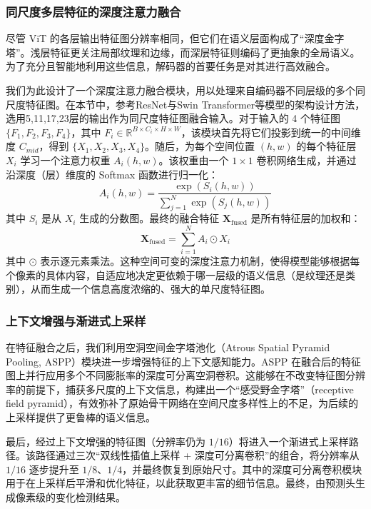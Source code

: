 \subsubsection{同尺度多层特征的深度注意力融合}
尽管 ViT 的各层输出特征图分辨率相同，但它们在语义层面构成了“深度金字塔”。浅层特征更关注局部纹理和边缘，而深层特征则编码了更抽象的全局语义。为了充分且智能地利用这些信息，解码器的首要任务是对其进行高效融合。

我们为此设计了一个深度注意力融合模块，用以处理来自编码器不同层级的多个同尺度特征图。在本节中，参考ResNet与Swin Transformer等模型的架构设计方法，选用5,11,17,23层的输出作为同尺度特征图融合输入。对于输入的 4 个特征图 $\{F_1, F_2, F_3, F_4\}$，其中 $F_i \in \mathbb{R}^{B \times C_i \times H \times W}$，该模块首先将它们投影到统一的中间维度 $C_{mid}$，得到 $\{X_1, X_2, X_3, X_4\}$。随后，为每个空间位置 $(h, w)$ 的每个特征层 $X_i$ 学习一个注意力权重 $A_i(h, w)$。该权重由一个 $1 \times 1$ 卷积网络生成，并通过沿深度（层）维度的 Softmax 函数进行归一化：
\begin{equation}
    A_i(h, w) = \frac{\exp(S_i(h, w))}{\sum_{j=1}^{N} \exp(S_j(h, w))}
\end{equation}
其中 $S_i$ 是从 $X_i$ 生成的分数图。最终的融合特征 $\mathbf{X}_{\text{fused}}$ 是所有特征层的加权和：
\begin{equation}
    \mathbf{X}_{\text{fused}} = \sum_{i=1}^{N} A_i \odot X_i
\end{equation}
其中 $\odot$ 表示逐元素乘法。这种空间可变的深度注意力机制，使得模型能够根据每个像素的具体内容，自适应地决定更依赖于哪一层级的语义信息（是纹理还是类别），从而生成一个信息高度浓缩的、强大的单尺度特征图。

\subsubsection{上下文增强与渐进式上采样}
在特征融合之后，我们利用空洞空间金字塔池化（Atrous Spatial Pyramid Pooling, ASPP）模块进一步增强特征的上下文感知能力。ASPP 在融合后的特征图上并行应用多个不同膨胀率的深度可分离空洞卷积。这能够在不改变特征图分辨率的前提下，捕获多尺度的上下文信息，构建出一个“感受野金字塔”（receptive field pyramid），有效弥补了原始骨干网络在空间尺度多样性上的不足，为后续的上采样提供了更鲁棒的语义信息。

最后，经过上下文增强的特征图（分辨率仍为 $1/16$）将进入一个渐进式上采样路径。该路径通过三次“双线性插值上采样 + 深度可分离卷积”的组合，将分辨率从 $1/16$ 逐步提升至 $1/8$、$1/4$，并最终恢复到原始尺寸。其中的深度可分离卷积模块用于在上采样后平滑和优化特征，以此获取更丰富的细节信息。最终，由预测头生成像素级的变化检测结果。

